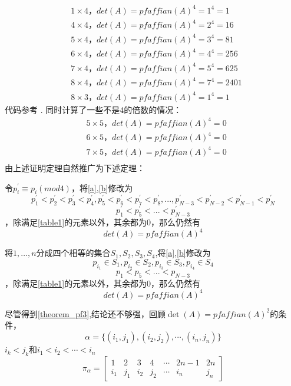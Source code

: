 \documentclass{amsc}          %
\numberwithin{equation}{section} %
\begin{document}
\begin{align*}
&1 \times4，det(A) = pfaffian(A)^{4} = 1^{4}=1\\
&4 \times4，det(A) = pfaffian(A)^{4} = 2^{4}=16\\
&5 \times4，det(A) = pfaffian(A)^{4} = 3^{4}=81\\
&6 \times4，det(A) = pfaffian(A)^{4} = 4^{4}=256\\
&7 \times4，det(A) = pfaffian(A)^{4} = 5^{4}=625\\
&8 \times4，det(A) = pfaffian(A)^{4} = 7^{4}=2401\\
&8 \times3，det(A) = pfaffian(A)^{4} = 1^{4}=1
\end{align*}
代码参考 \cite{IM}.
同时计算了一些不是4的倍数的情况：
\begin{align*}
&5 \times5，det(A) = pfaffian(A)^{4} =0\\
&6 \times5，det(A) = pfaffian(A)^{4} =0\\
&7 \times5，det(A) = pfaffian(A)^{4} =0\\
\end{align*}
由上述证明定理自然推广为下述定理：

\begin{theorem}
令$p^{'}_{i}\equiv p_{i} (mod 4)$，将\ref{a},\ref{b}修改为
\begin{equation}\label{aa}p^{'}_{1}<p^{'}_{2}<p^{'}_{3}<p^{'}_{4},p^{'}_{5}<p^{'}_{6}<p^{'}_{7}<p^{'}_{8}
   ,...,p^{'}_{N-3}<p^{'}_{N-2}<p^{'}_{N-1}<p^{'}_{N}\end{equation}
\begin{equation}\label{bb}p^{'}_{1}<p^{'}_{5}<...<p^{'}_{N-3}\end{equation}，除满足\ref{table1}的元素以外，其余都为0，那么仍然有$$det(A)=pfaffian(A)^{4}$$
\end{theorem}

\begin{theorem}\label{theorem_pf3}
将$1, \dots, n$分成四个相等的集合$S_{1},S_{2},S_{3},S_{4}$,将\ref{a},\ref{b}修改为
\begin{equation}p_{i_{1}} \in S_{1}, p_{i_{2}} \in S_{2}, p_{i_{3}} \in S_{3}, p_{i_{4}} \in S_{4}\end{equation}
\begin{equation}\label{bb}p_{1}<p_{5}<...<p_{N-3}\end{equation}，除满足\ref{table1}的元素以外，其余都为0，那么仍然有$$det(A)=pfaffian(A)^{4}$$
\end{theorem}


尽管得到\ref{theorem_pf3},结论还不够强，回顾$\det(A)=pfaffian (A)^{2}$的条件，
$$\alpha =\{(i_{1},j_{1}),(i_{2},j_{2}),\cdots ,(i_{n},j_{n})\}$$
$i_{k}<j_{k}$和$i_{1}<i_{2}<\cdots <i_{n}$
$${\displaystyle \pi _{\alpha }={\begin{bmatrix}1&2&3&4&\cdots &2n-1&2n\\i_{1}&j_{1}&i_{2}&j_{2}&\cdots &i_{n}&j_{n}\end{bmatrix}}}$$
\end{document}
